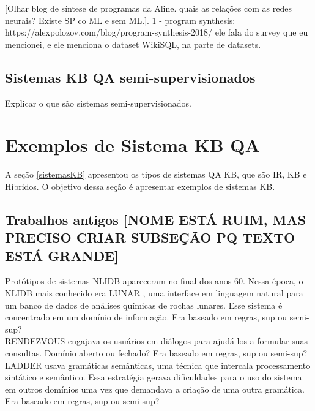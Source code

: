 \documentclass{article}
\begin{document}
[Olhar blog de síntese de programas da Aline. quais as relações com as redes neurais? Existe SP co ML e sem ML.]. 1 - program synthesis: https://alexpolozov.com/blog/program-synthesis-2018/ ele fala do survey que eu mencionei, e ele menciona o dataset WikiSQL, na parte de datasets.

\subsection{Sistemas KB QA semi-supervisionados}

Explicar o que são sistemas semi-supervisionados.


\section{Exemplos de Sistema KB QA\label{exemplosSistemasKB}}

A seção \ref{sistemasKB} apresentou os tipos de sistemas QA KB, que são IR, KB e Híbridos. O objetivo dessa seção é apresentar exemplos de sistemas KB.\\

\subsection{Trabalhos antigos [NOME ESTÁ RUIM, MAS PRECISO CRIAR SUBSEÇÃO PQ TEXTO ESTÁ GRANDE]}

Protótipos de sistemas NLIDB apareceram no final dos anos 60. Nessa época, o NLIDB mais conhecido era LUNAR \citep{woods1973progress}, uma interface em linguagem natural para um banco de dados de análises químicas de rochas lunares. Esse sistema é concentrado em um domínio de informação. Era baseado em regras, sup ou semi-sup?\\

RENDEZVOUS \citep{codd1974seven} engajava os usuários em diálogos para ajudá-los a formular suas consultas. Domínio aberto ou fechado? Era baseado em regras, sup ou semi-sup?\\

LADDER \citep{hendrix1978developing} usava gramáticas semânticas, uma técnica que intercala processamento sintático e semântico. Essa estratégia gerava dificuldades para o uso do sistema em outros domínios uma vez que demandava a criação de uma outra gramática. Era baseado em regras, sup ou semi-sup?\\
\end{document}

